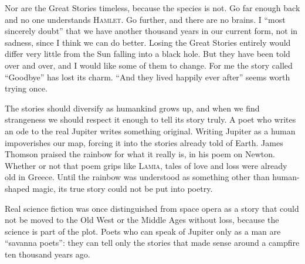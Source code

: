 Nor are the Great Stories timeless, because the species is not. Go far enough back and no one understands \textsc{Hamlet}. Go further, and there are no brains.  I ``most sincerely doubt'' that we have another thousand years in our current form, not in sadness, since I think we can do better. Losing the Great Stories entirely would differ very little from the Sun falling into a black hole. But they have been told over and over, and I would like some of them to change. For me the story called ``Goodbye'' has lost its charm. ``And they lived happily ever after'' seems worth trying once.

The stories should diversify as humankind grows up, and when we find strangeness we should respect it enough to tell its story truly. A poet who writes an ode to the real Jupiter writes something original. Writing Jupiter as a human impoverishes our map, forcing it into the stories already told of Earth. James Thomson praised the rainbow for what it really is, in his poem on Newton. Whether or not that poem grips like \textsc{Lamia}, tales of love and loss were already old in Greece. Until the rainbow was understood as something other than human-shaped magic, its true story could not be put into poetry. 

Real science fiction was once distinguished from space opera as a story that could not be moved to the Old West or the Middle Ages without loss, because the science is part of the plot. Poets who can speak of Jupiter only as a man are ``savanna poets'': they can tell only the stories that made sense around a campfire ten thousand years ago.

